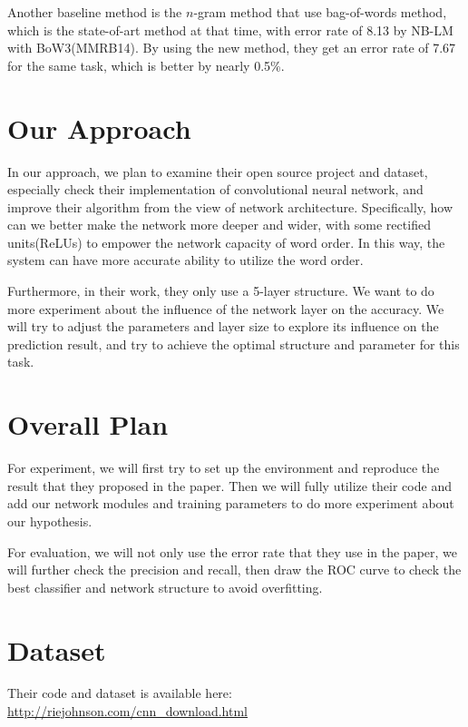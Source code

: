 \documentclass{article}
\begin{document}
Another baseline method is the $n$-gram method that use bag-of-words method, which is the state-of-art method at that time, with error rate of 8.13 by NB-LM with BoW3(MMRB14). By using the new method, they get an error rate of 7.67 for the same task, which is better by nearly 0.5\%.


\section{Our Approach}

In our approach, we plan to examine their open source project and dataset, especially check their implementation of convolutional neural network, and improve their algorithm from the view of network architecture. Specifically, how can we better make the network more deeper and wider, with some rectified units(ReLUs) to empower the network capacity of word order. In this way, the system can have more accurate ability to utilize the word order.

Furthermore, in their work, they only use a 5-layer structure. We want to do more experiment about the influence of the network layer on the accuracy. We will try to adjust the parameters and layer size to explore its influence on the prediction result, and try to achieve the optimal structure and parameter for this task.

\section{Overall Plan}

For experiment, we will first try to set up the environment and reproduce the result that they proposed in the paper. Then  we will fully utilize their code and add our network modules and training parameters to do more experiment about our hypothesis.

For evaluation, we will not only use the error rate that they use in the paper, we will further check the precision and recall, then draw the ROC curve to check the best classifier and network structure to avoid overfitting.

\section{Dataset}

Their code and dataset is available here: \url{http://riejohnson.com/cnn_download.html}
\end{document}
